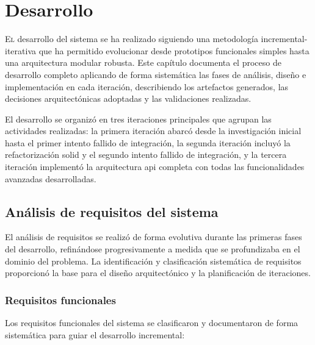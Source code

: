 
\chapter{Desarrollo}
\label{chap:desarrollo}

\lettrine{E}{l} desarrollo del sistema se ha realizado siguiendo una metodología incremental-iterativa que ha permitido evolucionar desde prototipos funcionales simples hasta una arquitectura modular robusta. Este capítulo documenta el proceso de desarrollo completo aplicando de forma sistemática las fases de análisis, diseño e implementación en cada iteración, describiendo los artefactos generados, las decisiones arquitectónicas adoptadas y las validaciones realizadas.

El desarrollo se organizó en tres iteraciones principales que agrupan las actividades realizadas: la primera iteración abarcó desde la investigación inicial hasta el primer intento fallido de integración, la segunda iteración incluyó la refactorización \acrshort{solid} y el segundo intento fallido de integración, y la tercera iteración implementó la arquitectura \acrshort{api} completa con todas las funcionalidades avanzadas desarrolladas.

\section{Análisis de requisitos del sistema}
\label{sec:analisis_requisitos_sistema}

El análisis de requisitos se realizó de forma evolutiva durante las primeras fases del desarrollo, refinándose progresivamente a medida que se profundizaba en el dominio del problema. La identificación y clasificación sistemática de requisitos proporcionó la base para el diseño arquitectónico y la planificación de iteraciones.

\subsection{Requisitos funcionales}
\label{subsec:requisitos_funcionales}

Los requisitos funcionales del sistema se clasificaron y documentaron de forma sistemática para guiar el desarrollo incremental:

